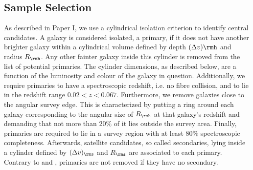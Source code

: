 \documentclass[fleqn,usenatbib,useAMS]{mnras}
\begin{document}
\subsection{Sample Selection}

As described in Paper I, we use a cylindrical isolation criterion to identify central candidates. A galaxy is considered isolated, a primary, if it does not have another brighter galaxy within a cylindrical volume defined by depth $(\Delta v)\rmh$ and radius $R_\rmh$. Any other fainter galaxy inside this cylinder is removed from the list of potential primaries. The cylinder dimensions, as described below, are a function of the luminosity and colour of the galaxy in question. Additionally, we require primaries to have a spectroscopic redshift, i.e. no fibre collision, and to lie in the redshift range $0.02 < z < 0.067$. Furthermore, we remove galaxies close to the angular survey edge. This is characterized by putting a ring around each galaxy corresponding to the angular size of $R_\rmh$ at that galaxy's redshift and demanding that not more than $20\%$ of it lies outside the survey area. Finally, primaries are required to lie in a survey region with at least $80\%$ spectroscopic completeness. Afterwards, satellite candidates, so called secondaries, lying inside a cylinder defined by $(\Delta v)_\rms$ and $R_\rms$ are associated to each primary. Contrary to \cite{vdBosch+04} and \cite{More+09b, More+09a, More+11}, primaries are not removed if they have no secondary.
\end{document}
